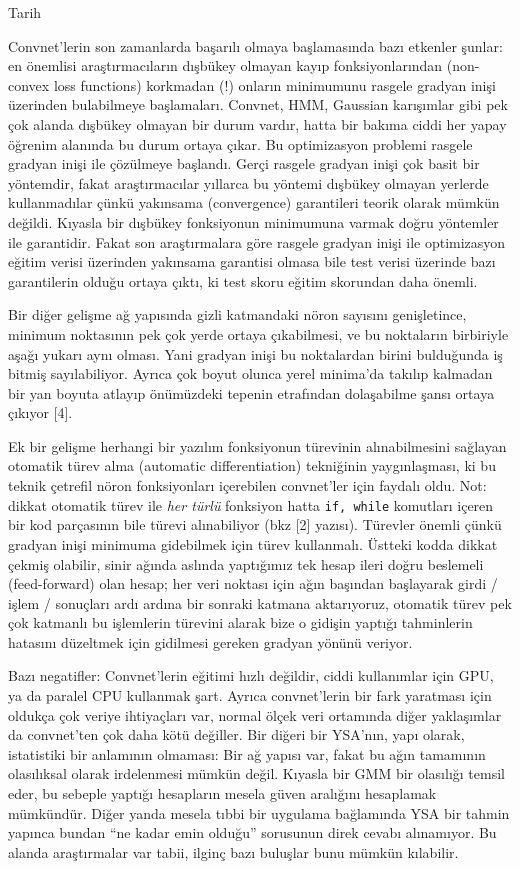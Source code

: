 \documentclass[12pt,fleqn]{article}\usepackage{../../common}
\begin{document}
Tarih

Convnet'lerin son zamanlarda başarılı olmaya başlamasında bazı etkenler
şunlar: en önemlisi araştırmacıların dışbükey olmayan kayıp
fonksiyonlarından (non-convex loss functions) korkmadan (!) onların
minimumunu rasgele gradyan inişi üzerinden bulabilmeye
başlamaları. Convnet, HMM, Gaussian karışımlar gibi pek çok alanda dışbükey
olmayan bir durum vardır, hatta bir bakıma ciddi her yapay öğrenim alanında
bu durum ortaya çıkar. Bu optimizasyon problemi rasgele gradyan inişi ile
çözülmeye başlandı. Gerçi rasgele gradyan inişi çok basit bir yöntemdir,
fakat araştırmacılar yıllarca bu yöntemi dışbükey olmayan yerlerde
kullanmadılar çünkü yakınsama (convergence) garantileri teorik olarak
mümkün değildi. Kıyasla bir dışbükey fonksiyonun minimumuna varmak doğru
yöntemler ile garantidir. Fakat son araştırmalara göre rasgele gradyan
inişi ile optimizasyon eğitim verisi üzerinden yakınsama garantisi olmasa
bile test verisi üzerinde bazı garantilerin olduğu ortaya çıktı, ki test
skoru eğitim skorundan daha önemli.

Bir diğer gelişme ağ yapısında gizli katmandaki nöron sayısını
genişletince, minimum noktasının pek çok yerde ortaya çıkabilmesi, ve bu
noktaların birbiriyle aşağı yukarı aynı olması. Yani gradyan inişi bu
noktalardan birini bulduğunda iş bitmiş sayılabiliyor. Ayrıca çok boyut
olunca yerel minima'da takılıp kalmadan bir yan boyuta atlayıp önümüzdeki
tepenin etrafından dolaşabilme şansı ortaya çıkıyor [4].

Ek bir gelişme herhangi bir yazılım fonksiyonun türevinin alınabilmesini
sağlayan otomatik türev alma (automatic differentiation) tekniğinin
yaygınlaşması, ki bu teknik çetrefil nöron fonksiyonları içerebilen
convnet'ler için faydalı oldu. Not: dikkat otomatik türev ile {\em her
  türlü} fonksiyon hatta \verb!if, while! komutları içeren bir kod
parçasının bile türevi alınabiliyor (bkz [2] yazısı). Türevler önemli çünkü
gradyan inişi minimuma gidebilmek için türev kullanmalı. Üstteki kodda
dikkat çekmiş olabilir, sinir ağında aslında yaptığımız tek hesap ileri
doğru beslemeli (feed-forward) olan hesap; her veri noktası için ağın
başından başlayarak girdi / işlem / sonuçları ardı ardına bir sonraki
katmana aktarıyoruz, otomatik türev pek çok katmanlı bu işlemlerin türevini
alarak bize o gidişin yaptığı tahminlerin hatasını düzeltmek için gidilmesi
gereken gradyan yönünü veriyor.

Bazı negatifler: Convnet'lerin eğitimi hızlı değildir, ciddi kullanımlar
için GPU, ya da paralel CPU kullanmak şart. Ayrıca convnet'lerin bir fark
yaratması için oldukça çok veriye ihtiyaçları var, normal ölçek veri
ortamında diğer yaklaşımlar da convnet'ten çok daha kötü değiller. Bir
diğeri bir YSA'nın, yapı olarak, istatistiki bir anlamının olmaması: Bir ağ
yapısı var, fakat bu ağın tamamının olasılıksal olarak irdelenmesi mümkün
değil. Kıyasla bir GMM bir olasılığı temsil eder, bu sebeple yaptığı
hesapların mesela güven aralığını hesaplamak mümkündür. Diğer yanda mesela
tıbbi bir uygulama bağlamında YSA bir tahmin yapınca bundan ``ne kadar emin
olduğu'' sorusunun direk cevabı alınamıyor. Bu alanda araştırmalar var
tabii, ilginç bazı buluşlar bunu mümkün kılabilir.
\end{document}
